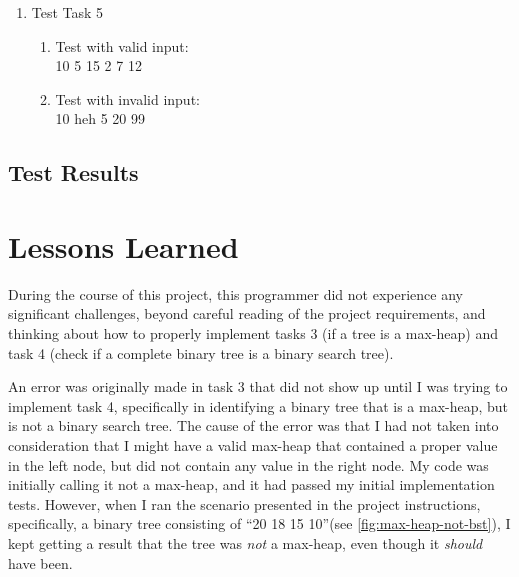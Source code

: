 \documentclass{scrartcl}
\begin{document}
\begin{enumerate}
\begin{enumerate}
    \item Test not BST and max-heap:\\ 10 5 15 2 7 12\label{task4-3}
    \item Test not BST and not max-heap:\\ 10 5 15 2 12 11 20\label{task4-4}
    \item Test single node tree:\\ 3\label{task4-5}
    \item Test empty tree:\\ \emph{null}\label{task4-6}
  \end{enumerate}
  \item Test Task 5
  \begin{enumerate}
    \item Test with valid input:\\ 10 5 15 2 7 12\label{task5-1}
    \item Test with invalid input:\\ 10 heh 5 20 99\label{task5-2}
  \end{enumerate}
\end{enumerate}
\subsection{Test Results}
\newpage
\newpage
\newpage
\newpage
\newpage
\newpage
\newpage
\newpage
\newpage
\newpage
\newpage
\newpage
\newpage
\newpage
\newpage
\newpage
\newpage
\newpage
\clearpage
\section{Lessons Learned}
During the course of this project, this programmer did not experience any
significant challenges, beyond careful reading of the project requirements,
and thinking about how to properly implement tasks 3 (if a tree is a max-heap)
and task 4 (check if a complete binary tree is a binary search tree).

An error was originally made in task 3 that did not show up until I was trying
to implement task 4, specifically in identifying a binary tree that is a max-heap,
but is not a binary search tree.  The cause of the error was that I had not taken
into consideration that I might have a valid max-heap that contained a proper
value in the left node, but did not contain any value in the right node.  My
code was initially calling it not a max-heap, and it had passed my initial
implementation tests.  However, when I ran the scenario presented in the
project instructions, specifically, a binary tree consisting of
\enquote{20 18 15 10}(see \ref{fig:max-heap-not-bst}), I kept getting a result that the tree was \emph{not}
a max-heap, even though it \emph{should} have been.
\end{document}
